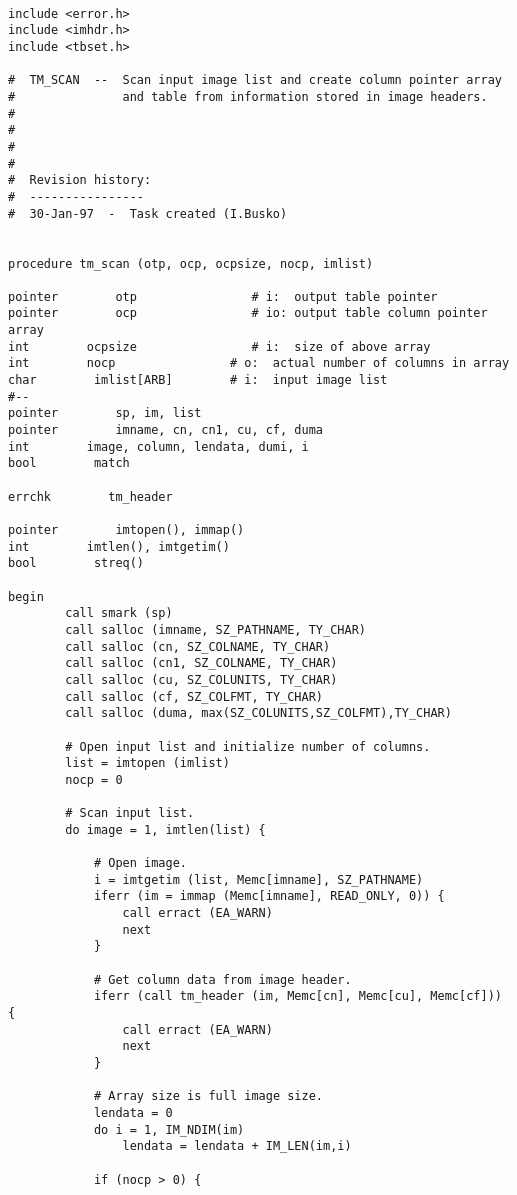 \begin{verbatim}

include <error.h>
include <imhdr.h>
include <tbset.h>

#  TM_SCAN  --  Scan input image list and create column pointer array 
#               and table from information stored in image headers.
#
#
#
#
#  Revision history:
#  ----------------
#  30-Jan-97  -  Task created (I.Busko)


procedure tm_scan (otp, ocp, ocpsize, nocp, imlist)

pointer        otp                # i:  output table pointer
pointer        ocp                # io: output table column pointer array
int        ocpsize                # i:  size of above array
int        nocp                # o:  actual number of columns in array
char        imlist[ARB]        # i:  input image list
#--
pointer        sp, im, list
pointer        imname, cn, cn1, cu, cf, duma
int        image, column, lendata, dumi, i
bool        match

errchk        tm_header

pointer        imtopen(), immap()
int        imtlen(), imtgetim()
bool        streq()

begin
        call smark (sp)
        call salloc (imname, SZ_PATHNAME, TY_CHAR)
        call salloc (cn, SZ_COLNAME, TY_CHAR)
        call salloc (cn1, SZ_COLNAME, TY_CHAR)
        call salloc (cu, SZ_COLUNITS, TY_CHAR)
        call salloc (cf, SZ_COLFMT, TY_CHAR)
        call salloc (duma, max(SZ_COLUNITS,SZ_COLFMT),TY_CHAR)

        # Open input list and initialize number of columns.
        list = imtopen (imlist)
        nocp = 0

        # Scan input list.
        do image = 1, imtlen(list) {

            # Open image.
            i = imtgetim (list, Memc[imname], SZ_PATHNAME)
            iferr (im = immap (Memc[imname], READ_ONLY, 0)) {
                call erract (EA_WARN)
                next
            }

            # Get column data from image header.
            iferr (call tm_header (im, Memc[cn], Memc[cu], Memc[cf])) {
                call erract (EA_WARN)
                next
            }

            # Array size is full image size.
            lendata = 0
            do i = 1, IM_NDIM(im)
                lendata = lendata + IM_LEN(im,i)

            if (nocp > 0) {


\end{verbatim}
